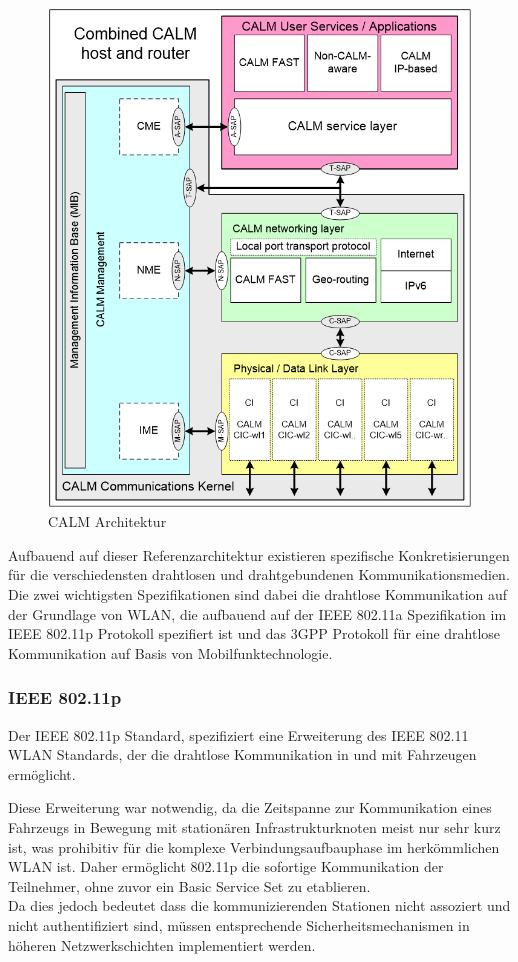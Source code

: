        
    \begin{figure}[h!]
        \begin{center}
        \includegraphics[width=0.7\linewidth]{./images/BP/CALM.png}
        \caption[]{CALM Architektur \cite{BP07}}
        \label{fig:CALM}
    \end{center}
    \end{figure}

    Aufbauend auf dieser Referenzarchitektur existieren spezifische Konkretisierungen für die verschiedensten drahtlosen und drahtgebundenen Kommunikationsmedien.
    Die zwei wichtigsten Spezifikationen sind dabei die drahtlose Kommunikation auf der Grundlage von WLAN, die aufbauend auf der IEEE 802.11a Spezifikation im IEEE 802.11p Protokoll \cite{BP10} spezifiert ist 
    und das 3GPP Protokoll für eine drahtlose Kommunikation auf Basis von Mobilfunktechnologie.

    \subsubsection{IEEE 802.11p}
    Der IEEE 802.11p Standard, spezifiziert eine Erweiterung des IEEE 802.11 WLAN Standards, der die drahtlose Kommunikation in und mit Fahrzeugen ermöglicht.

    Diese Erweiterung war notwendig, da die Zeitspanne zur Kommunikation eines Fahrzeugs in Bewegung mit stationären Infrastrukturknoten meist nur sehr kurz ist, was prohibitiv für die komplexe Verbindungsaufbauphase
    im herkömmlichen WLAN ist. Daher ermöglicht 802.11p die sofortige Kommunikation der Teilnehmer, ohne zuvor ein Basic Service Set zu etablieren.\\
    Da dies jedoch bedeutet dass die kommunizierenden Stationen nicht assoziert und nicht authentifiziert sind, müssen entsprechende Sicherheitsmechanismen in höheren Netzwerkschichten
    implementiert werden.

